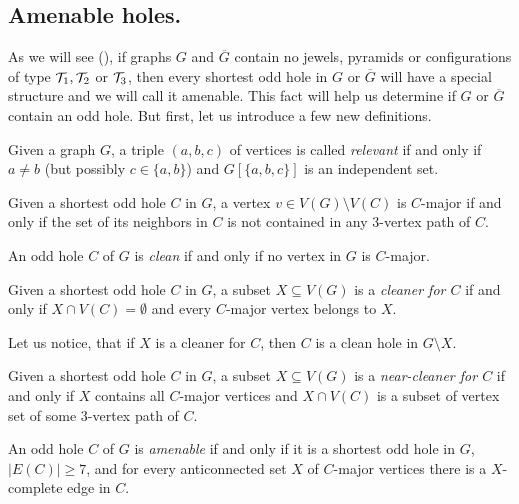 \subsection{Amenable holes.}
\label{AmenableHoles}
As we will see (), if graphs $G$ and $\overline{G}$ contain no jewels, pyramids or configurations of type $\mathcal{T}_1, \mathcal{T}_2$ or $\mathcal{T}_3$, then every shortest odd hole in $G$ or $\overline{G}$ will have a special structure and we will call it amenable. This fact will help us determine if $G$ or $\overline{G}$ contain an odd hole. But first, let us introduce a few new definitions.

\begin{defn}
	Given a graph $G$, a triple $(a, b, c)$ of vertices is called \emph{relevant} if and only if $a \neq b$ (but possibly $c \in \{a, b\}$) and $G[\{a,b,c\}]$ is an independent set.
\end{defn}

\begin{defn}
  Given a shortest odd hole $C$ in $G$, a vertex $v \in V(G) \setminus V(C)$ is $C$-major if and only if the set of its neighbors in $C$ is not contained in any 3-vertex path of $C$.
\end{defn}

\begin{defn}
  An odd hole $C$ of $G$ is \emph{clean} if and only if no vertex in $G$ is $C$-major.
\end{defn}

\begin{defn}[cleaner]
  Given a shortest odd hole $C$ in $G$, a subset $X \subseteq V(G)$ is a \emph{cleaner for $C$} if and only if $X \cap V(C) = \emptyset$ and every $C$-major vertex belongs to $X$.
\end{defn}

Let us notice, that if $X$ is a cleaner for $C$, then $C$ is a clean hole in $G \setminus X$.

\begin{defn}
  Given a shortest odd hole $C$ in $G$, a subset $X \subseteq V(G)$ is a \emph{near-cleaner for $C$} if and only if $X$ contains all $C$-major vertices and $X \cap V(C)$ is a subset of vertex set of some 3-vertex path of $C$.
\end{defn}

\begin{defn}
  An odd hole $C$ of $G$ is \emph{amenable} if and only if it is a shortest odd hole in $G$, $|E(C)| \geq 7$, and for every anticonnected set $X$ of $C$-major vertices there is a $X$-complete edge in $C$.
\end{defn}

